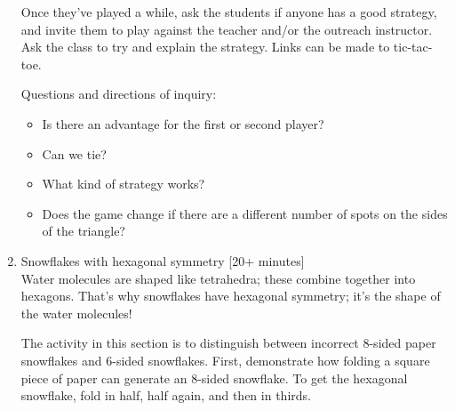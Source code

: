 \documentclass[12pt]{article}
\begin{document}
\begin{enumerate}
  Once they've played a while, ask the students if anyone has a good
  strategy, and invite them to play against the teacher and/or the
  outreach instructor.  Ask the class to try and explain the strategy.
  Links can be made to tic-tac-toe.

  Questions and directions of inquiry:
  \begin{itemize}
  \item Is there an advantage for the first or second player?
  \item Can we tie?
  \item What kind of strategy works?
  \item Does the game change if there are a different number of spots
    on the sides of the triangle?
  \end{itemize}
\item{Snowflakes with hexagonal symmetry [20+ minutes]}\\ Water
  molecules are shaped like tetrahedra; these combine together into
  hexagons.  That's why snowflakes have hexagonal symmetry; it's the shape
  of the water molecules!

  The activity in this section is to distinguish between incorrect
  8-sided paper snowflakes and 6-sided snowflakes.  First, demonstrate
  how folding a square piece of paper can generate an 8-sided
  snowflake.  To get the hexagonal snowflake, fold in half, half
  again, and then in thirds.
\end{enumerate}
\end{document}
